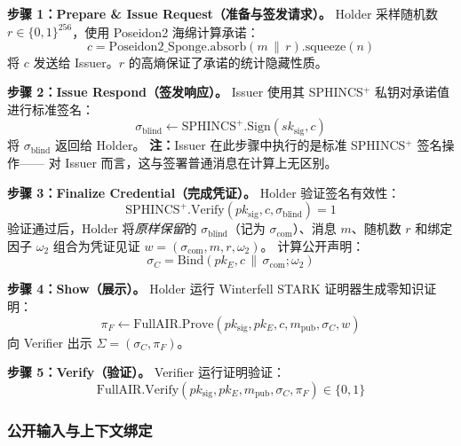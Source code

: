 \documentclass[11pt,a4paper]{ctexart}
\begin{document}
\textbf{步骤 1：Prepare \& Issue Request（准备与签发请求）。}
Holder 采样随机数 $r \in \{0,1\}^{256}$，使用 Poseidon2 海绵计算承诺：
\begin{equation}
  c = \mathrm{Poseidon2\_Sponge}.\mathrm{absorb}(m \,\|\, r).\mathrm{squeeze}(n)
\end{equation}
将 $c$ 发送给 Issuer。$r$ 的高熵保证了承诺的统计隐藏性质。

\textbf{步骤 2：Issue Respond（签发响应）。}
Issuer 使用其 SPHINCS$^+$ 私钥对承诺值进行标准签名：
\begin{equation}
  \sigma_{\mathrm{blind}} \leftarrow \mathrm{SPHINCS}^+.\mathrm{Sign}(sk_{\mathrm{sig}}, c)
\end{equation}
将 $\sigma_{\mathrm{blind}}$ 返回给 Holder。
\textbf{注：}Issuer 在此步骤中执行的是标准 SPHINCS$^+$ 签名操作——
对 Issuer 而言，这与签署普通消息在计算上无区别。

\textbf{步骤 3：Finalize Credential（完成凭证）。}
Holder 验证签名有效性：
\begin{equation}
  \mathrm{SPHINCS}^+.\mathrm{Verify}(pk_{\mathrm{sig}}, c, \sigma_{\mathrm{blind}}) = 1
\end{equation}
验证通过后，Holder 将\emph{原样保留}的 $\sigma_{\mathrm{blind}}$（记为
$\sigma_{\mathrm{com}}$）、消息 $m$、随机数 $r$ 和绑定因子 $\omega_2$
组合为凭证见证 $w = (\sigma_{\mathrm{com}}, m, r, \omega_2)$。
计算公开声明：
\begin{equation}
  \sigma_C = \mathrm{Bind}(pk_E, c \,\|\, \sigma_{\mathrm{com}}; \omega_2)
\end{equation}

\textbf{步骤 4：Show（展示）。}
Holder 运行 Winterfell STARK 证明器生成零知识证明：
\begin{equation}
  \pi_F \leftarrow \mathrm{FullAIR}.\mathrm{Prove}(pk_{\mathrm{sig}}, pk_E, c, m_{\mathrm{pub}}, \sigma_C, w)
\end{equation}
向 Verifier 出示 $\Sigma = (\sigma_C, \pi_F)$。

\textbf{步骤 5：Verify（验证）。}
Verifier 运行证明验证：
\begin{equation}
  \mathrm{FullAIR}.\mathrm{Verify}(pk_{\mathrm{sig}}, pk_E, m_{\mathrm{pub}}, \sigma_C, \pi_F) \in \{0,1\}
\end{equation}

\subsubsection{公开输入与上下文绑定}
\end{document}
